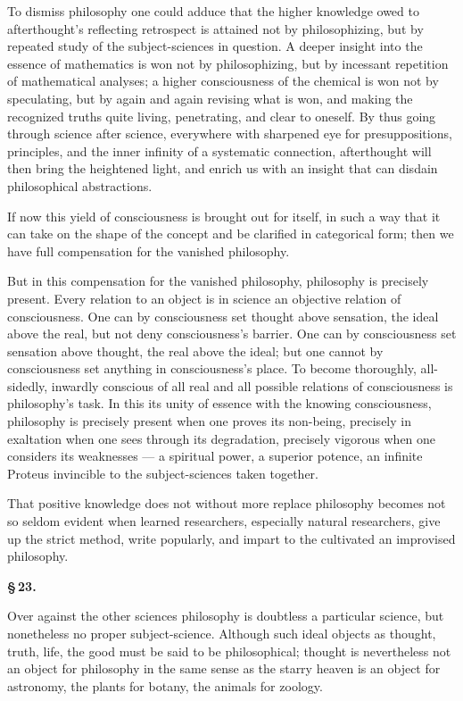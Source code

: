 \documentclass[12pt]{book}
\begin{document}
To dismiss philosophy one could adduce that the higher knowledge owed to afterthought's
reflecting retrospect is attained not by philosophizing, but by repeated study of the
subject-sciences in question. A deeper insight into the essence of mathematics is won not by
philosophizing, but by incessant repetition of mathematical analyses; a higher consciousness
of the chemical is won not by speculating, but by again and again revising what is won, and
making the recognized truths quite living, penetrating, and clear to oneself. By thus going
through science after science, everywhere with sharpened eye for presuppositions, principles,
and the inner infinity of a systematic connection, afterthought will then bring the heightened
light, and enrich us with an insight that can disdain philosophical abstractions.

If now this yield of consciousness is brought out for itself, in such a way that it can take
on the shape of the concept and be clarified in categorical form; then we have full
compensation for the vanished philosophy.

But in this compensation for the vanished philosophy, philosophy is precisely present. Every
relation to an object is in science an objective relation of consciousness. One can by
consciousness set thought above sensation, the
ideal above the real, but not deny consciousness's barrier. One can by consciousness set
sensation above thought, the real above the ideal; but one cannot by consciousness set
anything in consciousness's place. To become thoroughly, all-sidedly, inwardly conscious of
all real and all possible relations of consciousness is philosophy's task. In this its unity
of essence with the knowing consciousness, philosophy is precisely present when one proves its
non-being, precisely in exaltation when one sees through its degradation, precisely vigorous
when one considers its weaknesses — a spiritual power, a superior potence, an infinite Proteus
invincible to the subject-sciences taken together.

That positive knowledge does not without more replace philosophy becomes not so seldom evident
when learned researchers, especially natural researchers, give up the strict method, write
popularly, and impart to the cultivated an improvised philosophy.

\begin{center}{\bfseries \S\,23.}\end{center}

Over against the other sciences philosophy is doubtless a particular science, but nonetheless
no proper subject-science. Although such ideal objects as thought, truth, life, the good must
be said to be philosophical; thought is nevertheless not an object for philosophy in the same
sense as the starry heaven is an object for astronomy, the plants for botany, the animals for
zoology.
\end{document}
